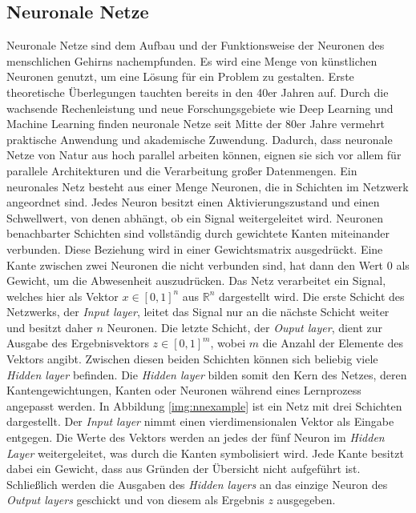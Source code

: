 \subsection{Neuronale Netze}

Neuronale Netze sind dem Aufbau und der Funktionsweise der Neuronen des menschlichen Gehirns nachempfunden. Es wird eine Menge von künstlichen Neuronen genutzt, um eine Lösung für ein Problem zu gestalten. Erste theoretische Überlegungen tauchten bereits in den 40er Jahren auf. Durch die wachsende Rechenleistung und neue Forschungsgebiete wie Deep Learning und Machine Learning finden neuronale Netze seit Mitte der 80er Jahre vermehrt praktische Anwendung und akademische Zuwendung. Dadurch, dass neuronale Netze von Natur aus hoch parallel arbeiten können, eignen sie sich vor allem für parallele Architekturen und die Verarbeitung großer Datenmengen. 
Ein neuronales Netz besteht aus einer Menge Neuronen, die in Schichten im Netzwerk angeordnet sind. Jedes Neuron besitzt einen Aktivierungszustand und einen Schwellwert, von denen abhängt, ob ein Signal weitergeleitet wird. Neuronen benachbarter Schichten sind vollständig durch gewichtete Kanten miteinander verbunden. Diese Beziehung wird in einer Gewichtsmatrix ausgedrückt. Eine Kante zwischen zwei Neuronen die nicht verbunden sind, hat dann den Wert 0 als Gewicht, um die Abwesenheit auszudrücken. 
Das Netz verarbeitet ein Signal, welches hier als Vektor $x \in [0,1]^n$ aus $\mathbb{R}^n$ dargestellt wird. Die erste Schicht des Netzwerks, der \textit{Input layer}, leitet das Signal nur an die nächste Schicht weiter und besitzt daher $n$ Neuronen. Die letzte Schicht, der \textit{Ouput layer}, dient zur Ausgabe des Ergebnisvektors $z \in [0,1]^m$, wobei $m$ die Anzahl der Elemente des Vektors angibt. Zwischen diesen beiden Schichten können sich beliebig viele \textit{Hidden layer} befinden. Die \textit{Hidden layer} bilden somit den Kern des Netzes, deren Kantengewichtungen, Kanten oder Neuronen während eines Lernprozess angepasst werden. In Abbildung \ref{img:nnexample} ist ein Netz mit drei Schichten dargestellt. Der \textit{Input layer} nimmt einen vierdimensionalen Vektor als Eingabe entgegen. Die Werte des Vektors werden an jedes der fünf Neuron im \textit{Hidden Layer} weitergeleitet, was durch die Kanten symbolisiert wird. Jede Kante besitzt dabei ein Gewicht, dass aus Gründen der Übersicht nicht aufgeführt ist. Schließlich werden die Ausgaben des \textit{Hidden layers} an das einzige Neuron des \textit{Output layers} geschickt und von diesem als Ergebnis $z$ ausgegeben. 


